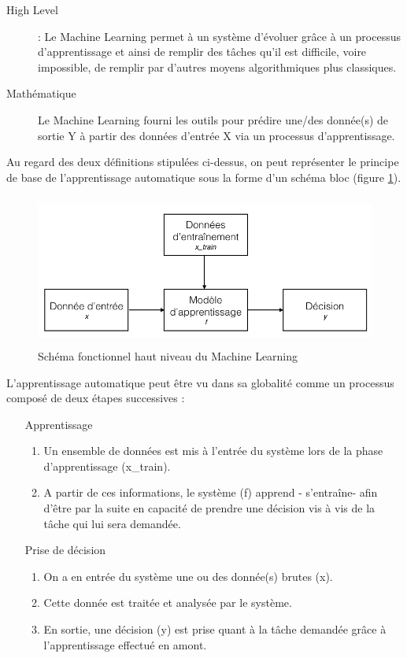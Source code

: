 \begin{description}
	\item[High Level]: Le Machine Learning permet à un système d'évoluer grâce à un processus d'apprentissage et ainsi de remplir des tâches qu'il est difficile, voire impossible, de remplir par d'autres moyens algorithmiques plus classiques. 
	\item[Mathématique] Le Machine Learning fourni les outils pour prédire une/des donnée(s) de sortie Y à partir des données d'entrée X via un processus d'apprentissage. 
\end{description}
 
Au regard des deux définitions stipulées ci-dessus, on peut représenter le principe de base de l'apprentissage automatique sous la forme d'un schéma bloc (figure \ref{fig:Schéma fonctionnel haut niveau du Machine Learning}).

\begin{figure}[h]
	\centering\includegraphics[height=5cm]{images/ML_high_level.jpeg}
	\caption{Schéma fonctionnel haut niveau du Machine Learning}
	\label{fig:Schéma fonctionnel haut niveau du Machine Learning}
\end{figure}

L'apprentissage automatique peut être vu dans sa globalité comme un processus composé de deux étapes successives : 
\begin{enumerate}
		\item [Apprentissage]
		 \begin{enumerate}
			\item  Un ensemble de données est mis à l'entrée du système lors de la phase d'apprentissage (x\_train).
			\item A partir de ces informations, le système (f) apprend - s'entraîne- afin d'être par la suite en capacité de prendre une décision vis à vis de la tâche qui lui sera demandée. 
		\end{enumerate}
		
		\item [Prise de décision] 
		\begin{enumerate}
			\item  On a en entrée du système une ou des donnée(s) brutes (x).  
			\item Cette donnée est traitée et analysée par le système.
			\item En sortie, une décision (y) est prise quant à la tâche demandée grâce à l'apprentissage effectué en amont. 
		\end{enumerate}
\end{enumerate}


